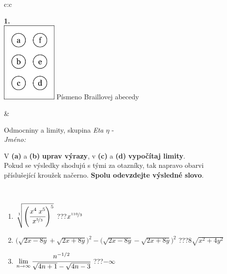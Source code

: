 \documentclass[10pt]{report}
\begin{document}
\begin{tabular}{c:c}
\begin{minipage}[c][104.5mm][t]{0.5\linewidth}
\begin{center}
\begin{minipage}{0.20\linewidth}
\begin{center}
{\Huge\bfseries 1.} \\[2mm]
\includegraphics[height=40mm]{../images/braille.png}
{\small Písmeno Braillovej abecedy}
\end{center}
\end{minipage}
\end{center}
\end{minipage}
&
\begin{minipage}[c][104.5mm][t]{0.5\linewidth}
\begin{center}
\vspace{7mm}
{\huge Odmocniny a limity, skupina \textit{Eta $\eta$} -}\\[5mm]
\textit{Jméno:}\phantom{xxxxxxxxxxxxxxxxxxxxxxxxxxxxxxxxxxxxxxxxxxxxxxxxxxxxxxxxxxxxxxxxx}\\[5mm]
\begin{minipage}{0.95\linewidth}
\begin{center}
V \textbf{(a)} a \textbf{(b)} \textbf{uprav výrazy}, v \textbf{(c)} a \textbf{(d)} \textbf{vypočítaj limity}.\\Pokud se výsledky shodujú s tými za otazníky, tak napravo obarvi\\příslušející kroužek načerno. \textbf{Spolu odevzdejte výsledné slovo}.
\end{center}
\end{minipage}
\\[1mm]
\begin{minipage}{0.79\linewidth}
\begin{center}
\begin{varwidth}{\linewidth}
\begin{enumerate}
\small
\item $\sqrt[1]{\left(\cfrac{x^{4}\;x^{5}}{x^{\nicefrac{5}{3}}}\right)^{5}}$\quad \dotfill\; ???\;\dotfill \quad $x^{\nicefrac{110}{3}}$
\item {\footnotesize{\scriptsize$\big(\sqrt{2x-8y}+\sqrt{2x+8y}\big)^2-\big(\sqrt{2x-8y}-\sqrt{2x+8y}\big)^2$}\quad \dotfill\; ???\;\dotfill \quad $8\sqrt{x^2+4y^2}$}
\item $\lim\limits_{n\to\infty}\cfrac{n^{-1/2}}{\sqrt{4n+1}-\sqrt{4n-3}}$\quad \dotfill\; ???\;\dotfill \quad $-\infty$

\end{enumerate}
\end{varwidth}
\end{center}
\end{minipage}
\end{center}
\end{minipage}
\end{tabular}
\end{document}
